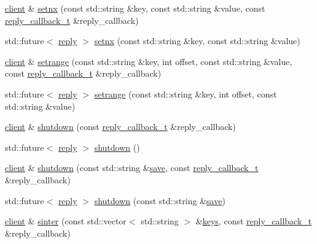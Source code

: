 \begin{DoxyCompactItemize}
\item 
\hyperlink{classcpp__redis_1_1client}{client} \& \hyperlink{classcpp__redis_1_1client_ad701f8b9e3769986b1af97049b52de83}{setnx} (const std\+::string \&key, const std\+::string \&value, const \hyperlink{classcpp__redis_1_1client_a061a1140d36d2eaeda82b09a0bb3f9f2}{reply\+\_\+callback\+\_\+t} \&reply\+\_\+callback)
\item 
std\+::future$<$ \hyperlink{classcpp__redis_1_1reply}{reply} $>$ \hyperlink{classcpp__redis_1_1client_a1ab0db92e48716812e4b30b268ce29ea}{setnx} (const std\+::string \&key, const std\+::string \&value)
\item 
\hyperlink{classcpp__redis_1_1client}{client} \& \hyperlink{classcpp__redis_1_1client_a3c1a2d69d9473de409f9102b61496f47}{setrange} (const std\+::string \&key, int offset, const std\+::string \&value, const \hyperlink{classcpp__redis_1_1client_a061a1140d36d2eaeda82b09a0bb3f9f2}{reply\+\_\+callback\+\_\+t} \&reply\+\_\+callback)
\item 
std\+::future$<$ \hyperlink{classcpp__redis_1_1reply}{reply} $>$ \hyperlink{classcpp__redis_1_1client_a628f79b8f8e424cdd4b70c076c21338a}{setrange} (const std\+::string \&key, int offset, const std\+::string \&value)
\item 
\hyperlink{classcpp__redis_1_1client}{client} \& \hyperlink{classcpp__redis_1_1client_acdb7064ddc309b1dbc6681ae559cc189}{shutdown} (const \hyperlink{classcpp__redis_1_1client_a061a1140d36d2eaeda82b09a0bb3f9f2}{reply\+\_\+callback\+\_\+t} \&reply\+\_\+callback)
\item 
std\+::future$<$ \hyperlink{classcpp__redis_1_1reply}{reply} $>$ \hyperlink{classcpp__redis_1_1client_ae457a1b446eff2e264452eb35de72d37}{shutdown} ()
\item 
\hyperlink{classcpp__redis_1_1client}{client} \& \hyperlink{classcpp__redis_1_1client_aca186e9b705a566203a47e8b29f99a28}{shutdown} (const std\+::string \&\hyperlink{classcpp__redis_1_1client_a01987f9fb419cfbce81872be8cd17619}{save}, const \hyperlink{classcpp__redis_1_1client_a061a1140d36d2eaeda82b09a0bb3f9f2}{reply\+\_\+callback\+\_\+t} \&reply\+\_\+callback)
\item 
std\+::future$<$ \hyperlink{classcpp__redis_1_1reply}{reply} $>$ \hyperlink{classcpp__redis_1_1client_a8587aeb1044e85ae580cd9661ea826dc}{shutdown} (const std\+::string \&\hyperlink{classcpp__redis_1_1client_a01987f9fb419cfbce81872be8cd17619}{save})
\item 
\hyperlink{classcpp__redis_1_1client}{client} \& \hyperlink{classcpp__redis_1_1client_a67a96ae85449a4dfa6e8976666562be1}{sinter} (const std\+::vector$<$ std\+::string $>$ \&\hyperlink{classcpp__redis_1_1client_acb7845a206b2321e6919c2f38282c322}{keys}, const \hyperlink{classcpp__redis_1_1client_a061a1140d36d2eaeda82b09a0bb3f9f2}{reply\+\_\+callback\+\_\+t} \&reply\+\_\+callback)

\end{DoxyCompactItemize}

